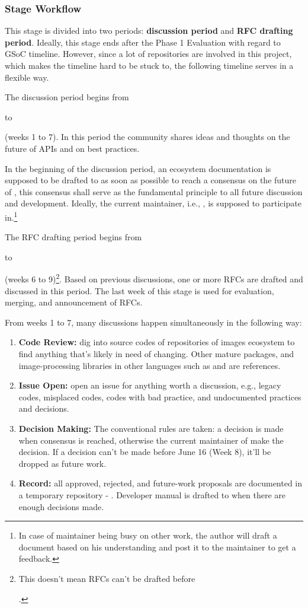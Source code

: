 \subsubsection*{Stage Workflow}

This stage is divided into two periods: \textbf{discussion period} and \textbf{RFC drafting period}. Ideally, this stage ends after the \textsf{Phase 1 Evaluation} with regard to GSoC timeline. However, since a lot of repositories are involved in this project, which makes the timeline hard to be stuck to, the following timeline serves in a flexible way.\par

The discussion period begins from \date{April 22} to \date{June 9} (weeks 1 to 7). In this period the community shares ideas and thoughts on the future of APIs and on best practices.\par

In the beginning of the discussion period, an ecosystem documentation is supposed to be drafted to \repoimagesgithubio{} as soon as possible to reach a consensus on the future of \images{}, this consensus shall serve as the fundamental principle to all future discussion and development. Ideally, the current \images{} maintainer, i.e., \timholy, is supposed to participate in.\footnote{In case of maintainer being busy on other work, the author will draft a document based on his understanding and post it to the maintainer to get a feedback.}\par

The RFC drafting period begins from \date{May 27} to \date{June 23} (weeks 6 to 9)\footnote{This doesn't mean RFCs can't be drafted before \date{May 27}.}. Based on previous discussions, one or more RFCs are drafted and discussed in this period. The last week of this stage is used for evaluation, merging, and announcement of RFCs.\par

From weeks 1 to 7, many discussions happen simultaneously in the following way:
\begin{enumerate}
    \item \textbf{Code Review:} dig into source codes of repositories of images ecosystem to find anything that's likely in need of changing. Other mature \langjulia{} packages, and image-processing libraries in other languages such as \reposcikitimage{} and \matlabimageprocessing{} are references.
    \item \textbf{Issue Open:} open an issue for anything worth a discussion, e.g., legacy codes, misplaced codes, codes with bad practice, and undocumented practices and decisions.
    \item \textbf{Decision Making:} The conventional rules are taken: a decision is made when consensus is reached, otherwise the current maintainer of \images{} make the decision. If a decision can't be made before June 16 (Week 8), it'll be dropped as future work.
    \item \textbf{Record:} all approved, rejected, and future-work proposals are documented in a temporary repository - \repogsoctempdoc{}. Developer manual is drafted to \repoimagesgithubio{} when there are enough decisions made.
\end{enumerate}


